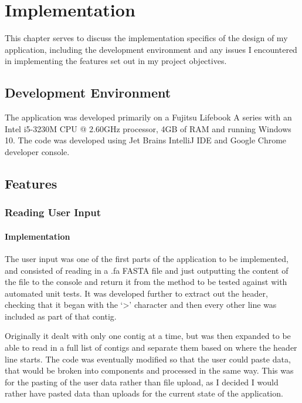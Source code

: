 \chapter{Implementation}
This chapter serves to discuss the implementation specifics of the design of my application, including the development environment and any issues I encountered in implementing the features set out in my project objectives.

\section{Development Environment}
The application was developed primarily on a Fujitsu Lifebook A series with an Intel i5-3230M CPU @ 2.60GHz processor, 4GB of RAM and running Windows 10. The code was developed using Jet Brains IntelliJ IDE and Google Chrome developer console.

\section{Features}
\subsection{Reading User Input}
\subsubsection{Implementation}
The user input was one of the first parts of the application to be implemented, and consisted of reading in a .fa FASTA file and just outputting the content of the file to the console and return it from the method to be tested against with automated unit tests. It was developed further to extract out the header, checking that it began with the `\textgreater ' character and then every other line was included as part of that contig. 

Originally it dealt with only one contig at a time, but was then expanded to be able to read in a full list of contigs and separate them based on where the header line starts. The code was eventually modified so that the user could paste data, that would be broken into components and processed in the same way. This was for the pasting of the user data rather than file upload, as I decided I would rather have pasted data than uploads for the current state of the application.

